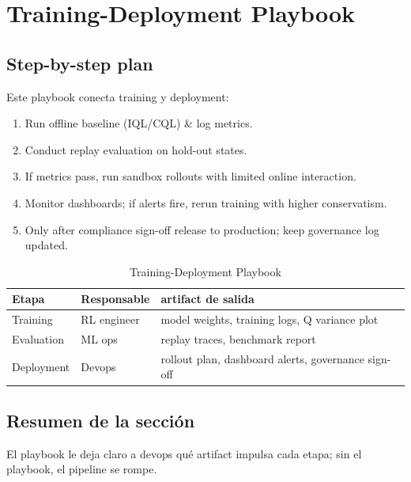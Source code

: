 \section{Training-Deployment Playbook}

\subsection{Step-by-step plan}

Este playbook conecta training y deployment:

\begin{enumerate}
    \item Run offline baseline (IQL/CQL) & log metrics.
    \item Conduct replay evaluation on hold-out states.
    \item If metrics pass, run sandbox rollouts with limited online interaction.
    \item Monitor dashboards; if alerts fire, rerun training with higher conservatism.
    \item Only after compliance sign-off release to production; keep governance log updated.
\end{enumerate}

\begin{table}[H]
\centering
\begin{tabular}{p{} p{} p{}}
\toprule
Etapa & Responsable & artifact de salida \\
\midrule
Training & RL engineer & model weights, training logs, Q variance plot \\
Evaluation & ML ops & replay traces, benchmark report \\
Deployment & Devops & rollout plan, dashboard alerts, governance sign-off \\
\bottomrule
\end{tabular}
\caption{Training-Deployment Playbook}
\end{table}

\subsection{Resumen de la sección}

El playbook le deja claro a devops qué artifact impulsa cada etapa; sin el playbook, el pipeline se rompe.

